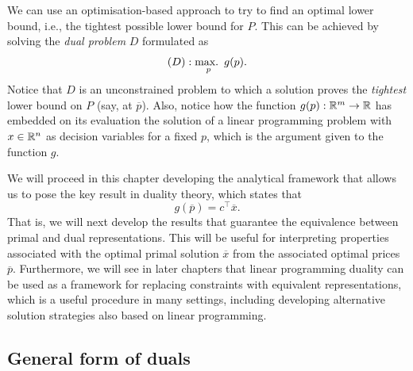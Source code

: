 We can use an optimisation-based approach to try to find an optimal lower bound, i.e., the tightest possible lower bound for $P$. This can be achieved by solving the \emph{dual problem} $D$ formulated as 
%
\begin{equation*}
	(D) : \mathop{\text{max.~}}_p g(p).
\end{equation*}
%
Notice that $D$ is an unconstrained problem to which a solution proves the \emph{tightest} lower bound on $P$ (say, at $\overline{p}$). Also, notice how the function $g(p) : \mathbb{R}^m \to \mathbb{R}$ has embedded on its evaluation the solution of a linear programming problem with $x \in \mathbb{R}^n$ as decision variables for a fixed $p$, which is the argument given to the function $g$. %

We will proceed in this chapter developing the analytical framework that allows us to pose the key result in duality theory, which states that 
%
\begin{equation*}
	g(\overline{p}) = c^\top \overline{x}.	
\end{equation*}
%
That is, we will next develop the results that guarantee the equivalence between primal and dual representations. This will be useful for interpreting properties associated with the optimal primal solution $\overline{x}$ from the associated optimal prices $\overline{p}$. Furthermore, we will see in later chapters that linear programming duality can be used as a framework for replacing constraints with equivalent representations, which is a useful procedure in many settings, including developing alternative solution strategies also based on linear programming. 


\subsection{General form of duals}

